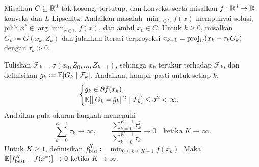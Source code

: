 \begin{theorem}
    Misalkan $C\subseteq\mathbb{R}^d$ tak kosong, tertutup, dan konveks, serta misalkan $f:\mathbb{R}^d\rightarrow\mathbb{R}$ konveks dan $L$-Lipschitz. Andaikan masalah $\min_{x\in C}f(x)$ mempunyai solusi, pilih $x^*\in\arg\min_{x\in C}f(x)$, dan ambil $x_0\in C$. Untuk $k\geq0$, misalkan
    $G_k\coloneqq G(x_k,Z_k)$ dan jalankan iterasi terproyeksi
    $x_{k+1}=\mathrm{proj}_C(x_k-\tau_kG_k)$ dengan $\tau_k>0$.

    Tuliskan $\mathcal F_k=\sigma(x_0,Z_0,\dots,Z_{k-1})$, sehingga $x_k$ terukur terhadap $\mathcal F_k$, dan definisikan $\bar g_k\coloneqq\mathbb{E}[G_k\mid\mathcal F_k]$. Andaikan, hampir pasti untuk setiap $k$,
    \begin{equation}
        \begin{cases}
            \bar g_k \in \partial f(x_k),\\
            \mathbb{E}[\|G_k-\bar g_k\|^2\mid\mathcal F_k]\leq \sigma^2<\infty.
        \end{cases}
    \end{equation}
    Andaikan pula ukuran langkah memenuhi
    \[
        \sum_{k=0}^{K-1}\tau_k\longrightarrow\infty,
        \qquad
        \frac{\sum_{k=0}^{K-1}\tau_k^2}{\sum_{k=0}^{K-1}\tau_k}\longrightarrow0
        \quad\text{ketika }K\longrightarrow\infty.
    \]
    Untuk $K\geq1$, definisikan
    $f_{\mathrm{best}}^K\coloneqq\min_{0\leq k\leq K-1}f(x_k)$.
    Maka $\mathbb{E}[f_{\mathrm{best}}^K-f(x^*)]\rightarrow0$ ketika $K\rightarrow\infty$.
\end{theorem}

